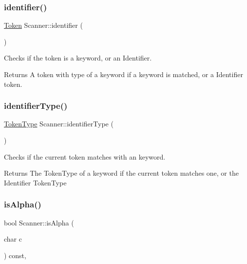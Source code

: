 \subsubsection{\texorpdfstring{identifier()}{identifier()}}
{\footnotesize\ttfamily \hyperlink{struct_token}{Token} Scanner\+::identifier (\begin{DoxyParamCaption}{ }\end{DoxyParamCaption})\hspace{0.3cm}{\ttfamily [private]}}



Checks if the token is a keyword, or an Identifier. 

\begin{DoxyReturn}{Returns}
A token with type of a keyword if a keyword is matched, or a Identifier token. 
\end{DoxyReturn}
\mbox{\label{class_scanner_a6648f48e10f8408d7fa427562fb21200}} 
\subsubsection{\texorpdfstring{identifier\+Type()}{identifierType()}}
{\footnotesize\ttfamily \hyperlink{_scanner_8h_aa520fbf142ba1e7e659590c07da31921}{Token\+Type} Scanner\+::identifier\+Type (\begin{DoxyParamCaption}{ }\end{DoxyParamCaption})\hspace{0.3cm}{\ttfamily [private]}}



Checks if the current token matches with an keyword. 

\begin{DoxyReturn}{Returns}
The Token\+Type of a keyword if the current token matches one, or the Identifier Token\+Type 
\end{DoxyReturn}
\mbox{\label{class_scanner_abc53d5d5a9051982708dc090a8977381}} 
\subsubsection{\texorpdfstring{is\+Alpha()}{isAlpha()}}
{\footnotesize\ttfamily bool Scanner\+::is\+Alpha (\begin{DoxyParamCaption}\item[{char}]{c }\end{DoxyParamCaption}) const\hspace{0.3cm}{\ttfamily [inline]}, {\ttfamily [private]}}




